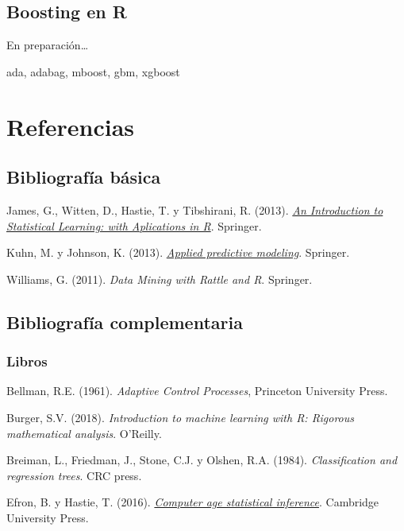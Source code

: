 \documentclass[]{book}
\theoremstyle{break}
\theoremstyle{definition}
\theoremstyle{definition}
\theoremstyle{definition}
\theoremstyle{remark}
\begin{document}
\section{Boosting en R}\label{boosting-en-r}

En preparación\ldots{}

ada, adabag, mboost, gbm, xgboost

\chapter*{Referencias}\label{referencias}

\section*{Bibliografía básica}\label{bibliografuxeda-buxe1sica}

James, G., Witten, D., Hastie, T. y Tibshirani, R. (2013).
\emph{\href{http://faculty.marshall.usc.edu/gareth-james/ISL}{An
Introduction to Statistical Learning: with Aplications in R}}. Springer.

Kuhn, M. y Johnson, K. (2013).
\emph{\href{http://appliedpredictivemodeling.com}{Applied predictive
modeling}}. Springer.

Williams, G. (2011). \emph{Data Mining with Rattle and R}. Springer.

\section*{Bibliografía
complementaria}\label{bibliografuxeda-complementaria}

\subsection*{Libros}\label{libros}

Bellman, R.E. (1961). \emph{Adaptive Control Processes}, Princeton
University Press.

Burger, S.V. (2018). \emph{Introduction to machine learning with R:
Rigorous mathematical analysis}. O'Reilly.

Breiman, L., Friedman, J., Stone, C.J. y Olshen, R.A. (1984).
\emph{Classification and regression trees}. CRC press.

Efron, B. y Hastie, T. (2016).
\emph{\href{http://web.stanford.edu/~hastie/CASI/}{Computer age
statistical inference}}. Cambridge University Press.
\end{document}
